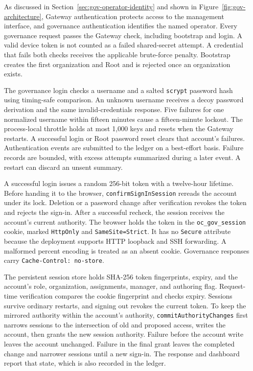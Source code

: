 {\color{red}As discussed in Section~\ref{sec:gov-operator-identity} and shown in
Figure~\ref{fig:gov-architecture}, Gateway authentication protects access to the
management interface, and governance authentication identifies the named
operator. Every governance request passes the Gateway check, including
bootstrap and login. A valid device token is not counted as a failed
shared-secret attempt. A credential that fails both checks receives the
applicable brute-force penalty. Bootstrap creates the first organization and
Root and is rejected once an organization exists.

The governance login checks a username and a salted \texttt{scrypt} password
hash using timing-safe comparison. An unknown username receives a decoy
password derivation and the same invalid-credentials response. Five failures
for one normalized username within fifteen minutes cause a fifteen-minute
lockout. The process-local throttle holds at most 1,000 keys and resets when
the Gateway restarts. A successful login or Root password reset clears that
account's failures. Authentication events are submitted to the ledger on a
best-effort basis. Failure records are bounded, with excess attempts summarized
during a later event. A restart can discard an unsent summary.

A successful login issues a random 256-bit token with a twelve-hour lifetime.
Before handing it to the browser, \texttt{confirmSignInSession} rereads the
account under its lock. Deletion or a password change after verification
revokes the token and rejects the sign-in. After a successful recheck, the session receives the
account's current authority. The browser holds the token in the
\texttt{oc\_gov\_session} cookie, marked \texttt{HttpOnly} and
\texttt{SameSite=Strict}. It has no \texttt{Secure} attribute because the
deployment supports HTTP loopback and SSH forwarding. A malformed percent
encoding is treated as an absent cookie. Governance responses carry
\texttt{Cache-Control: no-store}.

The persistent session store holds SHA-256 token fingerprints, expiry, and the
account's role, organization, assignments, manager, and authoring flag.
Request-time verification compares the cookie fingerprint and checks expiry.
Sessions survive ordinary restarts, and signing out revokes the current token.
To keep the mirrored authority within the account's authority,
\texttt{commitAuthorityChanges} first narrows sessions to the intersection of
old and proposed access, writes the account, then grants the new session
authority. Failure before the account write leaves the account unchanged. Failure in
the final grant leaves the completed change and narrower sessions until a new
sign-in. The response and dashboard report that state, which is also recorded in the ledger.

}
